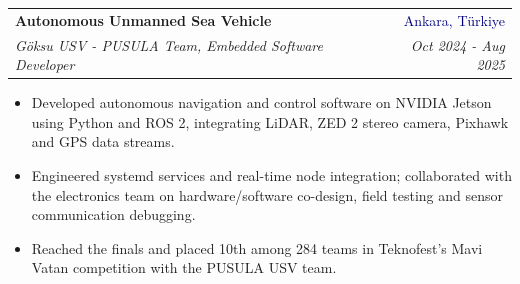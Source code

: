 \documentclass[10pt,letterpaper]{article}
\makeatletter
\newif\ifrocketexperience
\newif\ifmiddlemimce
\newcommand{\entry}[4]{%
  \begin{tabularx}{\textwidth}{@{}Xr@{}}
    \textbf{#1} & \textcolor{navy}{#2}\\
    \textit{#3} & \textit{#4}
  \end{tabularx}\vspace{1pt}}
\makeatother
\begin{document}
\entry{Autonomous Unmanned Sea Vehicle}{Ankara, Türkiye}
      {Göksu USV - PUSULA Team, Embedded Software Developer}{Oct 2024 - Aug 2025}
\begin{itemize}
  \item Developed autonomous navigation and control software on NVIDIA Jetson using Python and ROS 2, integrating LiDAR, ZED 2 stereo camera, Pixhawk and GPS data streams.
  \item Engineered systemd services and real-time node integration; collaborated with the electronics team on hardware/software co-design, field testing and sensor communication debugging.
  \item Reached the finals and placed 10th among 284 teams in Teknofest's Mavi Vatan competition with the PUSULA USV team.
\end{itemize}
\vspace{2pt}

\ifrocketexperience
  \Needspace{7\baselineskip}
  \entry{Rocket Avionics and Embedded Systems}{Ankara, Türkiye}
        {Gökçen Rocket Project - AYBÜ HEZARFEN Club, Avionics Team Member}{Sep 2023 - Jun 2024}
  \begin{itemize}
    \item Researched and evaluated suitable sensors for the rocket avionics system.
    \item Contributed to flight-control board development and assisted with sensor and component integration.
    \item Performed initial avionics-system testing with the team and documented the system for Teknofest.
  \end{itemize}
\fi

\ifmiddlemimce
  \Needspace{7\baselineskip}
  \section{Volunteering}
  \entry{MİMCE Mühendisler Derneği}{Ankara, Türkiye}
        {Secretary \& Member, University Council}{Sep 2025 - Present}
  \begin{itemize}
    \item Led Secretariat operations, managing formal communication with academic units and university council representatives.
    \item Planned and coordinated engineering-focused events and student development activities with the council team.
    \item Established structured record-keeping and follow-up processes to preserve continuity across council decisions.
    \item \href{https://mimce.org/}{mimce.org}
  \end{itemize}
\fi
\end{document}
